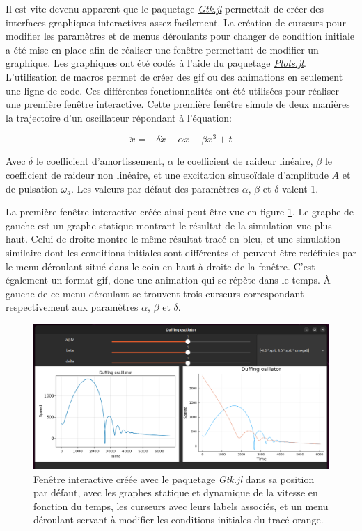 \documentclass[a4paper, french, 12pt, titlepage]{article}
\begin{document}
Il est vite devenu apparent que le paquetage \href{https://juliagraphics.github.io/Gtk.jl/latest/}{\emph{Gtk.jl}} permettait de créer des interfaces graphiques interactives assez facilement.
La création de curseurs pour modifier les paramètres et de menus déroulants pour changer de condition initiale a été mise en place afin de réaliser une fenêtre permettant de modifier un graphique.
Les graphiques ont été codés à l'aide du paquetage \href{https://docs.juliaplots.org/stable/}{\emph{Plots.jl}}.
L'utilisation de macros permet de créer des gif ou des animations en seulement une ligne de code.
Ces différentes fonctionnalités ont été utilisées pour réaliser une première fenêtre interactive.
Cette première fenêtre simule  de deux manières la trajectoire d'un oscillateur répondant à l'équation:

\begin{equation}
  \ddot x = - \delta  \dot x - \alpha  x - \beta  x^3 + t
\end{equation}


Avec $\delta$ le coefficient d'amortissement, $\alpha$ le coefficient de raideur linéaire, $\beta$ le coefficient de raideur non linéaire, et une excitation sinusoïdale d'amplitude $A$ et de pulsation $\omega_d$. Les valeurs par défaut des paramètres $\alpha$, $\beta$ et $\delta$ valent 1.


La première fenêtre interactive créée ainsi peut être vue en figure  \ref{fig:interactive1}. 
Le graphe de gauche est un graphe statique montrant le résultat de la simulation vue plus haut. Celui de droite montre le même résultat tracé en bleu, et une simulation similaire dont les conditions initiales sont différentes et peuvent être redéfinies par le menu déroulant situé dans le coin en haut à droite de la fenêtre. 
C'est également un format gif, donc une animation qui se répète dans le temps. 
À gauche de ce menu déroulant se trouvent trois curseurs correspondant respectivement aux paramètres $\alpha$, $\beta$ et $\delta$. 

\begin{figure}[H]
  \begin{center}
    \includegraphics[width=\linewidth]{interactivewindow_1.png}
  \end{center}

  \caption{Fenêtre interactive créée avec le paquetage \emph{Gtk.jl} dans sa position par défaut, avec les graphes statique et dynamique de la vitesse en fonction du temps, les curseurs avec leurs labels associés, et un menu déroulant servant à modifier les conditions initiales du tracé orange.}
  \label{fig:interactive1}
\end{figure}
\end{document}
